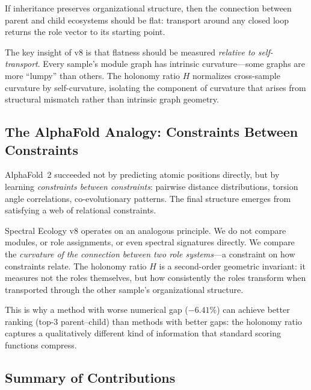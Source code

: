 \documentclass{../yalumba}
\begin{document}
\begin{pullquote}
If inheritance preserves organizational structure, then the connection
between parent and child ecosystems should be flat: transport around any
closed loop returns the role vector to its starting point.
\end{pullquote}

The key insight of v8 is that flatness should be measured \emph{relative to
self-transport}.  Every sample's module graph has intrinsic curvature---some
graphs are more ``lumpy'' than others.  The holonomy ratio $H$ normalizes
cross-sample curvature by self-curvature, isolating the component of
curvature that arises from structural mismatch rather than intrinsic graph
geometry.

\subsection{The AlphaFold Analogy: Constraints Between Constraints}

AlphaFold~2 succeeded not by predicting atomic positions directly, but by
learning \emph{constraints between constraints}: pairwise distance
distributions, torsion angle correlations, co-evolutionary patterns.  The
final structure emerges from satisfying a web of relational constraints.


Spectral Ecology v8 operates on an analogous principle.  We do not compare
modules, or role assignments, or even spectral signatures directly.  We
compare the \emph{curvature of the connection between two role systems}---a
constraint on how constraints relate.  The holonomy ratio $H$ is a
second-order geometric invariant: it measures not the roles themselves, but
how consistently the roles transform when transported through the other
sample's organizational structure.

This is why a method with worse numerical gap ($-6.41\%$) can achieve better
ranking (top-3 parent--child) than methods with better gaps: the holonomy
ratio captures a qualitatively different kind of information that standard
scoring functions compress.

\subsection{Summary of Contributions}
\end{document}
